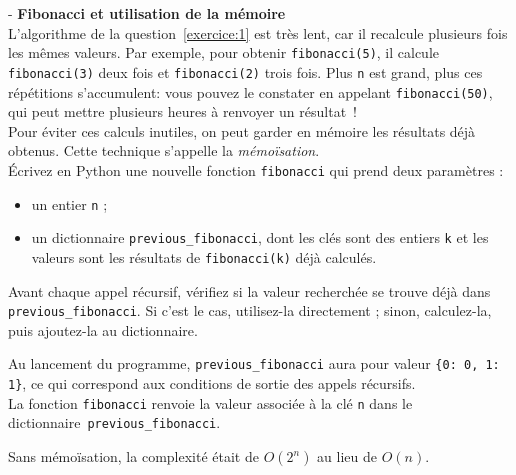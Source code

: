 \begin{Exercice}[15 minutes] - \textbf{Fibonacci et utilisation de la mémoire}\\

L'algorithme de la question~\ref{exercice:1} est très lent, car il recalcule plusieurs fois les mêmes valeurs. Par exemple, pour obtenir \lstinline{fibonacci(5)}, il calcule \lstinline{fibonacci(3)} deux fois et \lstinline{fibonacci(2)} trois fois. Plus \lstinline{n} est grand, plus ces répétitions s'accumulent: vous pouvez le constater en appelant \lstinline{fibonacci(50)}, qui peut mettre plusieurs heures à renvoyer un résultat~! \\

Pour éviter ces calculs inutiles, on peut garder en mémoire les résultats déjà obtenus. Cette technique s'appelle la \emph{mémoïsation}. \\ 

Écrivez en Python une nouvelle fonction \lstinline{fibonacci} qui prend deux paramètres :
\begin{itemize}
  \item un entier \lstinline{n} ;
  \item un dictionnaire \lstinline{previous_fibonacci}, dont les clés sont des entiers \lstinline{k} et les valeurs sont les résultats de \lstinline{fibonacci(k)} déjà calculés.
\end{itemize}

Avant chaque appel récursif, vérifiez si la valeur recherchée se trouve déjà dans \lstinline{previous_fibonacci}. Si c'est le cas, utilisez-la directement ; sinon, calculez-la, puis ajoutez-la au dictionnaire.

\begin{conseil}
    Au lancement du programme, \lstinline{previous_fibonacci} aura pour valeur \texttt{\{0: 0, 1: 1\}}, ce qui correspond aux conditions de sortie des appels récursifs.\\

    La fonction \lstinline{fibonacci} renvoie la valeur associée à la clé \lstinline{n} dans le dictionnaire~\lstinline{previous_fibonacci}.
\end{conseil}

\begin{solution}
    Sans mémoïsation, la complexité était de \(O(2^n)\) au lieu de \(O(n)\).
     
\end{solution}

\end{Exercice}

